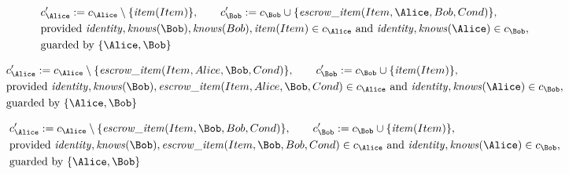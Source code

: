 \begin{align*}
&
c'_
{
\Alice
}
 := 
c_
{
\Alice
}
 \setminus 
\{
\mathit{\detokenize{
item
}}
(
Item
)
\}
, \qquad 
c'_
{
\Bob
}
 := 
c_
{
\Bob
}
 \cup 
\{
\mathit{\detokenize{
escrow_item
}}
(
Item
,
\Alice
,
Bob
,
Cond
)
\}
,\\
&
\text{provided } 
\mathit{\detokenize{
identity
}}
,
\mathit{\detokenize{
knows
}}
(
\Bob
)
,
\mathit{\detokenize{
knows
}}
(
Bob
)
,
\mathit{\detokenize{
item
}}
(
Item
)
 \in c_
{
\Alice
}
 \text{ and } 
\mathit{\detokenize{
identity
}}
,
\mathit{\detokenize{
knows
}}
(
\Alice
)
 \in c_
{
\Bob
}
,\\
&
\text{guarded by } \{
\Alice
,
\Bob
\}
\end{align*}

\begin{align*}
&
c'_
{
\Alice
}
 := 
c_
{
\Alice
}
 \setminus 
\{
\mathit{\detokenize{
escrow_item
}}
(
Item
,
Alice
,
\Bob
,
Cond
)
\}
, \qquad 
c'_
{
\Bob
}
 := 
c_
{
\Bob
}
 \cup 
\{
\mathit{\detokenize{
item
}}
(
Item
)
\}
,\\
&
\text{provided } 
\mathit{\detokenize{
identity
}}
,
\mathit{\detokenize{
knows
}}
(
\Bob
)
,
\mathit{\detokenize{
escrow_item
}}
(
Item
,
Alice
,
\Bob
,
Cond
)
 \in c_
{
\Alice
}
 \text{ and } 
\mathit{\detokenize{
identity
}}
,
\mathit{\detokenize{
knows
}}
(
\Alice
)
 \in c_
{
\Bob
}
,\\
&
\text{guarded by } \{
\Alice
,
\Bob
\}
\end{align*}

\begin{align*}
&
c'_
{
\Alice
}
 := 
c_
{
\Alice
}
 \setminus 
\{
\mathit{\detokenize{
escrow_item
}}
(
Item
,
\Bob
,
Bob
,
Cond
)
\}
, \qquad 
c'_
{
\Bob
}
 := 
c_
{
\Bob
}
 \cup 
\{
\mathit{\detokenize{
item
}}
(
Item
)
\}
,\\
&
\text{provided } 
\mathit{\detokenize{
identity
}}
,
\mathit{\detokenize{
knows
}}
(
\Bob
)
,
\mathit{\detokenize{
escrow_item
}}
(
Item
,
\Bob
,
Bob
,
Cond
)
 \in c_
{
\Alice
}
 \text{ and } 
\mathit{\detokenize{
identity
}}
,
\mathit{\detokenize{
knows
}}
(
\Alice
)
 \in c_
{
\Bob
}
,\\
&
\text{guarded by } \{
\Alice
,
\Bob
\}
\end{align*}
